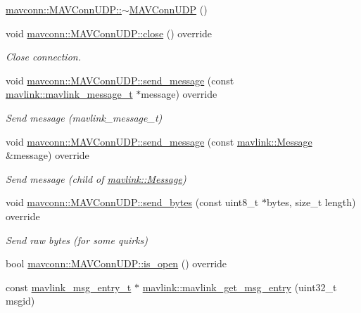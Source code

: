 \begin{DoxyCompactItemize}
\item 
\mbox{\hyperlink{group__mavconn_gad9edacd1a8f5993cdcfb188f83e3ca49}{mavconn\+::\+M\+A\+V\+Conn\+U\+D\+P\+::$\sim$\+M\+A\+V\+Conn\+U\+DP}} ()
\item 
void \mbox{\hyperlink{group__mavconn_ga78a057400db4bf2240b00e29d4251dfe}{mavconn\+::\+M\+A\+V\+Conn\+U\+D\+P\+::close}} () override
\begin{DoxyCompactList}\small\item\em Close connection. \end{DoxyCompactList}\item 
void \mbox{\hyperlink{group__mavconn_gae33a3895701a613a72d7fc1ab9bbb3d8}{mavconn\+::\+M\+A\+V\+Conn\+U\+D\+P\+::send\+\_\+message}} (const \mbox{\hyperlink{include__v0_89_2mavlink__types_8h_a63b963764c09dc72f4910c1521e325b9}{mavlink\+::mavlink\+\_\+message\+\_\+t}} $\ast$message) override
\begin{DoxyCompactList}\small\item\em Send message (mavlink\+\_\+message\+\_\+t) \end{DoxyCompactList}\item 
void \mbox{\hyperlink{group__mavconn_gae5e3ad4657f7aa9e970d0cb7a6bc367d}{mavconn\+::\+M\+A\+V\+Conn\+U\+D\+P\+::send\+\_\+message}} (const \mbox{\hyperlink{structmavlink_1_1Message}{mavlink\+::\+Message}} \&message) override
\begin{DoxyCompactList}\small\item\em Send message (child of \mbox{\hyperlink{structmavlink_1_1Message}{mavlink\+::\+Message}}) \end{DoxyCompactList}\item 
void \mbox{\hyperlink{group__mavconn_ga7a1a56365cb5355da86a6a6e2bb4bc8e}{mavconn\+::\+M\+A\+V\+Conn\+U\+D\+P\+::send\+\_\+bytes}} (const uint8\+\_\+t $\ast$bytes, size\+\_\+t length) override
\begin{DoxyCompactList}\small\item\em Send raw bytes (for some quirks) \end{DoxyCompactList}\item 
bool \mbox{\hyperlink{group__mavconn_ga496ff8d6806b35c993740cc05727f59c}{mavconn\+::\+M\+A\+V\+Conn\+U\+D\+P\+::is\+\_\+open}} () override
\item 
const \mbox{\hyperlink{include__v2_80_2mavlink__types_8h_abf009bf897407a543e5209298ad82321}{mavlink\+\_\+msg\+\_\+entry\+\_\+t}} $\ast$ \mbox{\hyperlink{group__mavconn_ga5729c8752b868b9b15dc7154a66c4a14}{mavlink\+::mavlink\+\_\+get\+\_\+msg\+\_\+entry}} (uint32\+\_\+t msgid)
\end{DoxyCompactItemize}
